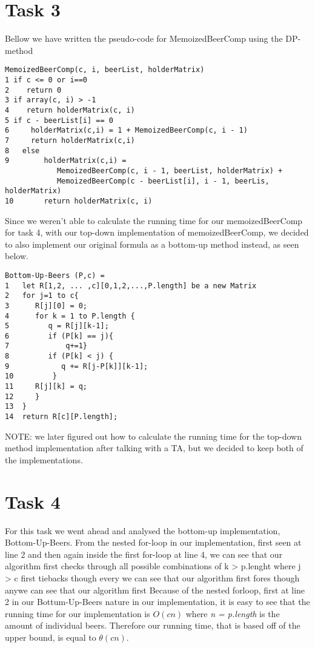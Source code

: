 \documentclass[12pt]{article}
\begin{document}
\section{Task 3}
Bellow we have written the pseudo-code for MemoizedBeerComp using the DP-method\\
\begin{verbatim}
MemoizedBeerComp(c, i, beerList, holderMatrix)
1 if c <= 0 or i==0
2    return 0
3 if array(c, i) > -1
4    return holderMatrix(c, i)
5 if c - beerList[i] == 0
6     holderMatrix(c,i) = 1 + MemoizedBeerComp(c, i - 1)
7     return holderMatrix(c,i)
8   else
9        holderMatrix(c,i) =
            MemoizedBeerComp(c, i - 1, beerList, holderMatrix) +
            MemoizedBeerComp(c - beerList[i], i - 1, beerLis, holderMatrix)
10       return holderMatrix(c, i)
\end{verbatim}
Since we weren't able to calculate the running time for our memoizedBeerComp for task 4, with our top-down implementation of memoizedBeerComp, we decided to also implement our original formula as a bottom-up method instead, as seen below.
\begin{verbatim}
Bottom-Up-Beers (P,c) = 
1   let R[1,2, ... ,c][0,1,2,...,P.length] be a new Matrix
2   for j=1 to c{
3      R[j][0] = 0;
4      for k = 1 to P.length {
5         q = R[j][k-1];
6         if (P[k] == j){ 
7             q+=1}   
8         if (P[k] < j) {
9            q += R[j-P[k]][k-1];
10         }
11     R[j][k] = q;	
12     }
13  }
14	return R[c][P.length];
\end{verbatim}
NOTE: we later figured out how to calculate the running time for the top-down method implementation after talking with a TA, but we decided to keep both of the implementations.
\section{Task 4}
For this task we went ahead and analysed the bottom-up implementation, Bottom-Up-Beers. From the nested for-loop in our implementation, first seen at line 2 and then again inside the first for-loop at line 4, we can see that our algorithm first checks through all possible combinations of k > p.lenght where j > c first tiebacks though every we can see that our algorithm first fores though anywe can see that our algorithm first Because of the nested forloop, first at line 2 in our Bottum-Up-Beers nature in our implementation, it is easy to see that the running time for our implementation is $O(cn)$ where \textit{n = p.length} is the amount of individual beers. Therefore our running time, that is based off of the upper bound, is equal to $\theta(cn)$.\\
\end{document}

